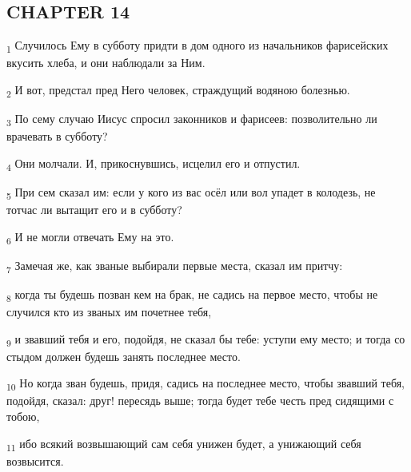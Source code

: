 \subsection{CHAPTER 14}
\begin{tcolorbox}
\textsubscript{1} Случилось Ему в субботу придти в дом одного из начальников фарисейских вкусить хлеба, и они наблюдали за Ним.
\end{tcolorbox}
\begin{tcolorbox}
\textsubscript{2} И вот, предстал пред Него человек, страждущий водяною болезнью.
\end{tcolorbox}
\begin{tcolorbox}
\textsubscript{3} По сему случаю Иисус спросил законников и фарисеев: позволительно ли врачевать в субботу?
\end{tcolorbox}
\begin{tcolorbox}
\textsubscript{4} Они молчали. И, прикоснувшись, исцелил его и отпустил.
\end{tcolorbox}
\begin{tcolorbox}
\textsubscript{5} При сем сказал им: если у кого из вас осёл или вол упадет в колодезь, не тотчас ли вытащит его и в субботу?
\end{tcolorbox}
\begin{tcolorbox}
\textsubscript{6} И не могли отвечать Ему на это.
\end{tcolorbox}
\begin{tcolorbox}
\textsubscript{7} Замечая же, как званые выбирали первые места, сказал им притчу:
\end{tcolorbox}
\begin{tcolorbox}
\textsubscript{8} когда ты будешь позван кем на брак, не садись на первое место, чтобы не случился кто из званых им почетнее тебя,
\end{tcolorbox}
\begin{tcolorbox}
\textsubscript{9} и звавший тебя и его, подойдя, не сказал бы тебе: уступи ему место; и тогда со стыдом должен будешь занять последнее место.
\end{tcolorbox}
\begin{tcolorbox}
\textsubscript{10} Но когда зван будешь, придя, садись на последнее место, чтобы звавший тебя, подойдя, сказал: друг! пересядь выше; тогда будет тебе честь пред сидящими с тобою,
\end{tcolorbox}
\begin{tcolorbox}
\textsubscript{11} ибо всякий возвышающий сам себя унижен будет, а унижающий себя возвысится.
\end{tcolorbox}
